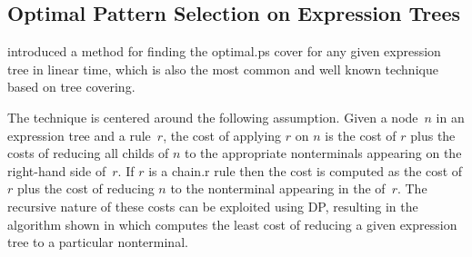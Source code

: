 \subsection{Optimal Pattern Selection on Expression Trees}

\textcite{AhoEtAl:1989} introduced a method for finding the \gls{optimal.ps}
\gls{cover} for any given \gls{expression tree} in linear time, which is also
the most common and well known technique based on \gls{tree covering}.

The technique is centered around the following assumption.
%
Given a \gls{node}~$n$ in an \gls{expression tree} and a \gls{rule}~$r$\!, the
cost of applying $r$ on $n$ is the cost of $r$ plus the costs of reducing all
\glspl{child} of $n$ to the appropriate \glspl{nonterminal} appearing on the
right-hand side of~$r$\!.
%
If $r$ is a \gls{chain.r} \gls{rule} then the cost is computed as the cost of
$r$ plus the cost of reducing $n$ to the \gls{nonterminal} appearing in the
 of~$r$\!.
%
The recursive nature of these costs can be exploited using \glsdesc{DP},
resulting in the algorithm shown in  which
computes the least cost of reducing a given \gls{expression tree} to a
particular \gls{nonterminal}.

